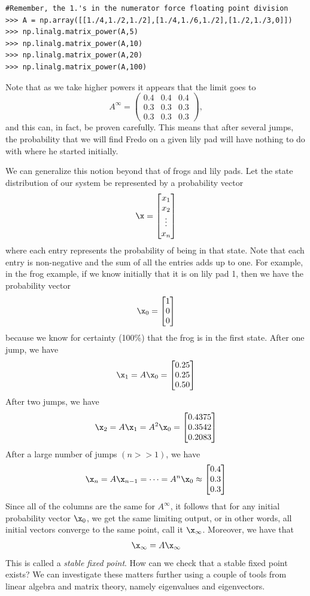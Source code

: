 \begin{lstlisting}
#Remember, the 1.'s in the numerator force floating point division
>>> A = np.array([[1./4,1./2,1./2],[1./4,1./6,1./2],[1./2,1./3,0]])
>>> np.linalg.matrix_power(A,5)
>>> np.linalg.matrix_power(A,10)
>>> np.linalg.matrix_power(A,20)
>>> np.linalg.matrix_power(A,100)
\end{lstlisting}

Note that as we take higher powers it appears that the limit goes to
\[
A^\infty = \begin{pmatrix}
0.4 & 0.4 & 0.4\\
0.3 & 0.3 & 0.3\\
0.3 & 0.3 & 0.3
\end{pmatrix},
\]
and this can, in fact, be proven carefully.
This means that after several jumps, the probability that we will find Fredo on a given lily pad will have nothing to do with where he started initially.


We can generalize this notion beyond that of frogs and lily pads.
Let the state distribution of our system be represented by a probability vector
\[
\x = \begin{bmatrix}
x_1\\
x_2\\
\vdots\\
x_n
\end{bmatrix}
\]
where each entry represents the probability of being in that state.
Note that each entry is non-negative and the sum of all the entries adds up to one.
For example, in the frog example, if we know initially that it is on lily pad 1, then we have the probability vector
\[
\x_0 = \begin{bmatrix}
1\\
0\\
0
\end{bmatrix}
\]
because we know for certainty (100\%) that the frog is in the first state.
After one jump, we have
\[
\x_1 = A \x_0 = \begin{bmatrix}
0.25\\
0.25\\
0.50
\end{bmatrix}
\]
After two jumps, we have
\[
\x_2 = A \x_1 = A^2 \x_0 = \begin{bmatrix}
0.4375\\
0.3542\\
0.2083
\end{bmatrix}
\]
After a large number of jumps $(n>>1)$, we have
\[
\x_n = A \x_{n-1} = \dots = A^n \x_0 \approx \begin{bmatrix}
0.4\\
0.3\\
0.3
\end{bmatrix}
\]
Since all of the columns are the same for $A^\infty$, it follows that for any initial probability vector $\x_0$, we get the same limiting output, or in other words, all initial vectors converge to the same point, call it $\x_\infty$.
Moreover, we have that
\[
\x_\infty = A \x_\infty
\]
This is called a \emph{stable fixed point}.
How can we check that a stable fixed point exists?
We can investigate these matters further using a couple of tools from
linear algebra and matrix theory, namely eigenvalues and eigenvectors.

